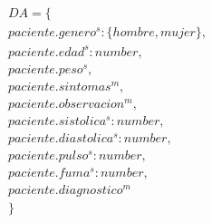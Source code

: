 \documentclass[10pt, a4paper,spanish]{article}
\begin{document}
			\begin{multline*}
				DA = \{ \\
					paciente.genero^s:\{hombre, mujer\}, \\
					paciente.edad^s:number, \\
					paciente.peso^s, \\
					paciente.sintomas^m, \\
					paciente.observacion^m, \\
					paciente.sistolica^s:number, \\
					paciente.diastolica^s:number, \\
					paciente.pulso^s:number, \\
					paciente.fuma^s:number, \\
 					paciente.diagnostico^m \\
				\}
			\end{multline*}
\end{document}
